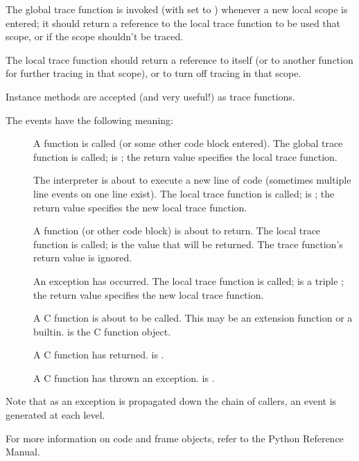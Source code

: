 The global trace function is invoked (with  set to
) whenever a new local scope is entered; it should return
a reference to the local trace function to be used that scope, or
 if the scope shouldn't be traced.

The local trace function should return a reference to itself (or to
another function for further tracing in that scope), or  to
turn off tracing in that scope.

Instance methods are accepted (and very useful!) as trace functions.

The events have the following meaning:

\begin{description}

\item[]
A function is called (or some other code block entered).  The global
trace function is called;  is ;
the return value specifies the local trace function.

\item[]
The interpreter is about to execute a new line of code (sometimes
multiple line events on one line exist).  The local trace function is
called;  is ; the return value specifies the new
local trace function.

\item[]
A function (or other code block) is about to return.  The local trace
function is called;  is the value that will be returned.  The
trace function's return value is ignored.

\item[]
An exception has occurred.  The local trace function is called;
 is a triple ; the return value specifies the new local trace
function.

\item[]
A C function is about to be called.  This may be an extension function
or a builtin.   is the C function object.

\item[]
A C function has returned.  is .

\item[]
A C function has thrown an exception.   is .

\end{description}

Note that as an exception is propagated down the chain of callers, an
 event is generated at each level.

For more information on code and frame objects, refer to the
Python Reference Manual.
